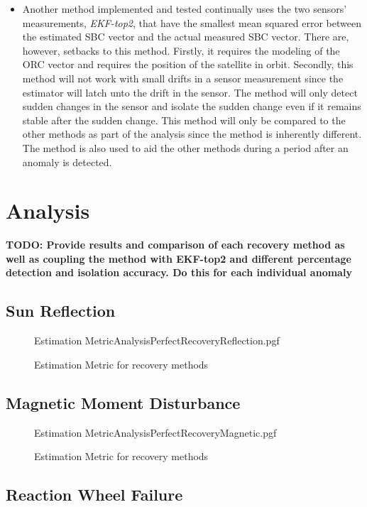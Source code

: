 \begin{itemize}
	\item Another method implemented and tested continually uses the two sensors' measurements, \emph{EKF-top2}, that have the smallest mean squared error between the estimated SBC vector and the actual measured SBC vector. There are, however, setbacks to this method. Firstly, it requires the modeling of the ORC vector and requires the position of the satellite in orbit. Secondly, this method will not work with small drifts in a sensor measurement since the estimator will latch unto the drift in the sensor. The method will only detect sudden changes in the sensor and isolate the sudden change even if it remains stable after the sudden change. This method will only be compared to the other methods as part of the analysis since the method is inherently different. The method is also used to aid the other methods during a period after an anomaly is detected.
\end{itemize}

\section{Analysis}
\textbf{TODO: Provide results and comparison of each recovery method as well as coupling the method with EKF-top2 and different percentage detection and isolation accuracy. Do this for each individual anomaly}

\subsection{Sun Reflection}

\begin{figure}[!htb]
	\centering
	\def\pgfwidth{7cm}
	{Estimation MetricAnalysisPerfectRecoveryReflection.pgf}
	
	\caption{Estimation Metric for recovery methods}
	\label{fig:RecoveryComparisonReflection}
\end{figure}

\subsection{Magnetic Moment Disturbance}

\begin{figure}[!htb]
	\centering
	\def\pgfwidth{7cm}
	{Estimation MetricAnalysisPerfectRecoveryMagnetic.pgf}
	
	\caption{Estimation Metric for recovery methods}
	\label{fig:RecoveryComparisonMagnetic}
\end{figure}

\subsection{Reaction Wheel Failure}